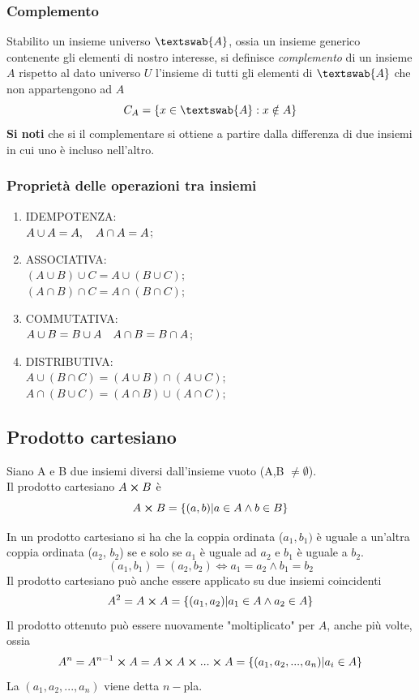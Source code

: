 \begin{flushleft}
\subsubsection{Complemento}
Stabilito un insieme universo $\textswab{A}$, ossia un insieme generico contenente gli elementi di nostro interesse, si definisce \textit{complemento} di un insieme $A$ rispetto al dato universo $U$ l'insieme di tutti gli elementi di $\textswab{A}$ che non appartengono ad $A$
\[C_A = \{x\in \textswab{A}:x\notin A\}\]
\textbf{Si noti} che si il complementare si ottiene a partire dalla differenza di due insiemi in cui uno è incluso nell'altro.

\subsubsection{Proprietà delle operazioni tra insiemi}
\begin{enumerate}
    \item IDEMPOTENZA:\\
    $A \cup A = A,\hspace{10px}A\cap A = A$;
    \item ASSOCIATIVA:\\
    $(A \cup B) \cup C = A \cup (B \cup C);$\\
    $(A \cap B) \cap C = A \cap (B \cap C);$
    \item COMMUTATIVA:\\
    $A \cup B = B\cup A\hspace{10px}A \cap B = B\cap A$;
    \item DISTRIBUTIVA:\\
    $A \cup (B \cap C) = (A \cup B) \cap (A \cup C);$\\
    $A \cap (B \cup C) = (A \cap B) \cup (A \cap C);$
\end{enumerate}

\subsection{Prodotto cartesiano}
Siano A e B due insiemi diversi dall'insieme vuoto (A,B $\neq \emptyset$).\\
Il prodotto cartesiano $A\cross B$ è 
\[A\cross B=\{(a,b)|a\in A \land  b\in B\}\]

In un prodotto cartesiano si ha che la coppia ordinata ($a_1,b_1)$ è uguale a un'altra coppia ordinata ($a_2$, $b_2$) se e solo se $a_1$ è uguale ad $a_2$ e $b_1$ è uguale a $b_2$.
\[(a_1, b_1) = (a_2, b_2) \Leftrightarrow a_1 = a_2 \land b_1 = b_2\]
Il prodotto cartesiano può anche essere applicato su due insiemi coincidenti
\[A^2 = A\cross A =\{(a_1, a_2)|a_1\in A \land a_2 \in A\}\]
Il prodotto ottenuto può essere nuovamente "moltiplicato" per $A$, anche più volte, ossia
\[A^n = A^{n-1} \cross A = A \cross A \cross ... \cross A = \{(a_1,a_2,...,a_n)|a_i \in A\}\]
La $(a_1,a_2,...,a_n)$ viene detta $n-$pla.



\end{flushleft}
